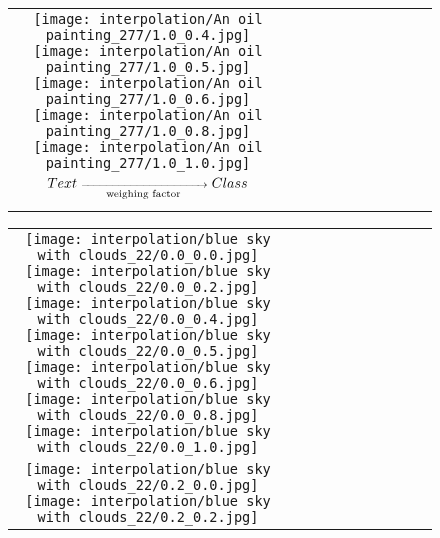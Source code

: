 \documentclass[10pt,twocolumn,letterpaper]{article}
\begin{document}
\begin{figure*}[tb!]
{\begin{tabular}{c c c c c c c c c c}
   \texttt{[image: interpolation/An oil painting\_277/1.0\_0.4.jpg]}
  \texttt{[image: interpolation/An oil painting\_277/1.0\_0.5.jpg]}
  \texttt{[image: interpolation/An oil painting\_277/1.0\_0.6.jpg]}
  \texttt{[image: interpolation/An oil painting\_277/1.0\_0.8.jpg]}
  \texttt{[image: interpolation/An oil painting\_277/1.0\_1.0.jpg]}
    \tabularnewline
        \raisebox{0.1in}{\rotatebox{90}{
 }}
 \hspace{0.5mm}
$\scriptsize{Text}\xrightarrow[\text{weighing factor}]{\hspace*{3cm}}\scriptsize{Class}$
  \tabularnewline
\vspace{2mm}
\vspace{-2\baselineskip}
\end{tabular}}
\vspace{-0.8cm}
\hspace{20pt}
\label{fig:glideablation15}
\vspace{-2mm}
\end{figure*} \begin{figure*}[tb!]
    \centering
    \setlength{\tabcolsep}{0.5pt}
    {\small
    \renewcommand{\arraystretch}{0.5} 
    \begin{tabular}{c c c c c c c c c c}
    \captionsetup{type=figure, font=scriptsize}
    \raisebox{0.1in}{\rotatebox{90}{\small \emph{$0.0$}
 }}
  \texttt{[image: interpolation/blue sky with clouds\_22/0.0\_0.0.jpg]}
  \texttt{[image: interpolation/blue sky with clouds\_22/0.0\_0.2.jpg]}
  \texttt{[image: interpolation/blue sky with clouds\_22/0.0\_0.4.jpg]}
  \texttt{[image: interpolation/blue sky with clouds\_22/0.0\_0.5.jpg]}
  \texttt{[image: interpolation/blue sky with clouds\_22/0.0\_0.6.jpg]}
  \texttt{[image: interpolation/blue sky with clouds\_22/0.0\_0.8.jpg]}
  \texttt{[image: interpolation/blue sky with clouds\_22/0.0\_1.0.jpg]}
 \tabularnewline
     \raisebox{0.1in}{\rotatebox{90}{\small \emph{$0.2$}
 }}
  \texttt{[image: interpolation/blue sky with clouds\_22/0.2\_0.0.jpg]}
  \texttt{[image: interpolation/blue sky with clouds\_22/0.2\_0.2.jpg]}

\end{tabular}}
\end{figure*}
\end{document}
